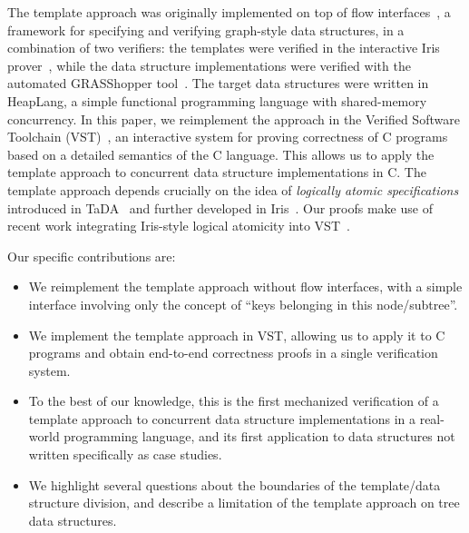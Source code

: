 \documentclass[a4paper,UKenglish,cleveref, autoref, thm-restate]{lipics-v2021}
\begin{document}

The template approach was originally implemented on top of flow interfaces~\cite{krishna2017flow}, a framework for specifying and verifying graph-style data structures, in a combination of two verifiers: the templates were verified in the interactive Iris prover~\cite{iris}, while the data structure implementations were verified with the automated GRASShopper tool~\cite{grasshopper}. The target data structures were written in HeapLang, a simple functional programming language with shared-memory concurrency. In this paper, we reimplement the approach in the Verified Software Toolchain (VST)~\cite{plcc}, an interactive system for proving correctness of C programs based on a detailed semantics of the C language. This allows us to apply the template approach to concurrent data structure implementations in C. The template approach depends crucially on the idea of \emph{logically atomic specifications} introduced in TaDA~\cite{tada} and further developed in Iris~\cite{iris}. Our proofs make use of recent work integrating Iris-style logical atomicity into VST~\cite{iris-vst-arxiv}. %

Our specific contributions are:
\begin{itemize}
\item We reimplement the template approach without flow interfaces, with a simple interface involving only the concept of ``keys belonging in this node/subtree''.
\item We implement the template approach in VST, allowing us to apply it to C programs and obtain end-to-end correctness proofs in a single verification system.
\item To the best of our knowledge, this is the first mechanized verification of a template approach to concurrent data structure implementations in a real-world programming language, and its first application to data structures not written specifically as case studies.
\item We highlight several questions about the boundaries of the template/data structure division, and describe a limitation of the template approach on tree data structures.
\end{itemize}
\end{document}
